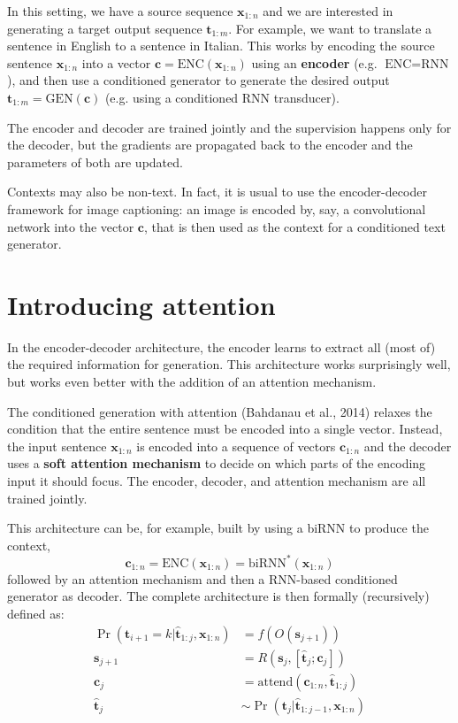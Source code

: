 In this setting, we have a source sequence $\mathbf{x}_{1:n}$ and we are interested in generating a target output sequence $\mathbf{t}_{1:m}$. For example, we want to translate a sentence in English to a sentence in Italian. This works by encoding the source sentence $\mathbf{x}_{1:n}$ into a vector $\mathbf{c}=\text{ENC}(\mathbf{x}_{1:n})$ using an \textbf{encoder} (e.g. $\text{ENC}=\text{RNN}$), and then use a conditioned generator to generate the desired output $\mathbf{t}_{1:m}=\text{GEN}(\mathbf{c})$ (e.g. using a conditioned RNN transducer).

The encoder and decoder are trained jointly and the supervision happens only for the decoder, but the gradients are propagated back to the encoder and the parameters of both are updated.

\begin{note}{}
Contexts may also be non-text. In fact, it is usual to use the encoder-decoder framework for image captioning: an image is encoded by, say, a convolutional network into the vector $\mathbf{c}$, that is then used as the context for a conditioned text generator.
\end{note}

\section{Introducing attention}
In the encoder-decoder architecture, the encoder learns to extract all (most of) the required information for generation. This architecture works surprisingly well, but works even better with the addition of an attention mechanism.

The conditioned generation with attention (Bahdanau et al., 2014) relaxes the condition that the entire sentence must be encoded into a single vector. Instead, the input sentence $\mathbf{x}_{1:n}$ is encoded into a sequence of vectors $\mathbf{c}_{1:n}$ and the decoder uses a \textbf{soft attention mechanism} to decide on which parts of the encoding input it should focus. The encoder, decoder, and attention mechanism are all trained jointly.

This architecture can be, for example, built by using a biRNN to produce the context,
\[
\mathbf{c}_{1:n}=\text{ENC}(\mathbf{x}_{1:n})=\text{biRNN}^*(\mathbf{x}_{1:n})
\]
followed by an attention mechanism and then a RNN-based conditioned generator as decoder. The complete architecture is then formally (recursively) defined as:
\[
\begin{aligned}
\Pr(\mathbf{t}_{i+1}=k|\hat{\mathbf{t}}_{1:j},\mathbf{x}_{1:n})&=f(O(\mathbf{s}_{j+1})) \\
\mathbf{s}_{j+1}&=R(\mathbf{s}_{j}, [\hat{\mathbf{t}}_{j};\mathbf{c}_j]) \\
\mathbf{c}_j&=\text{attend}(\mathbf{c}_{1:n}, \hat{\mathbf{t}}_{1:j}) \\
\hat{\mathbf{t}}_{j} &\sim \Pr(\mathbf{t}_{j}|\hat{\mathbf{t}}_{1:j-1}, \mathbf{x}_{1:n})
\end{aligned}
\]

